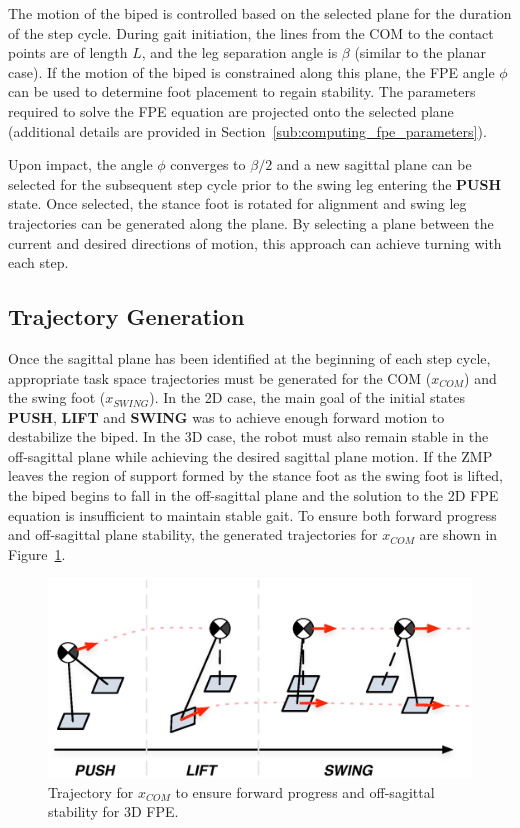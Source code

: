 The motion of the biped is controlled based on the selected plane for the duration of the step cycle. During gait initiation, the lines from the COM to the contact points are of length $L$, and the leg separation angle is $\beta$ (similar to the planar case). If the motion of the biped is constrained along this plane, the FPE angle $\phi$ can be used to determine foot placement to regain stability. The parameters required to solve the FPE equation are projected onto the selected plane (additional details are provided in Section~\ref{sub:computing_fpe_parameters}).

Upon impact, the angle $\phi$ converges to $\beta/2$ and a new sagittal plane can be selected for the subsequent step cycle prior to the swing leg entering the \textbf{PUSH} state. Once selected, the stance foot is rotated for alignment and swing leg trajectories can be generated along the plane. By selecting a plane between the current and desired directions of motion, this approach can achieve turning with each step.


\subsection{Trajectory Generation} %
\label{sub:trajectory_generation}
Once the sagittal plane has been identified at the beginning of each step cycle, appropriate task space trajectories must be generated for the COM ($x_{COM}$) and the swing foot ($x_{SWING}$). In the 2D case, the main goal of the initial states \textbf{PUSH}, \textbf{LIFT} and \textbf{SWING} was to achieve enough forward motion to destabilize the biped. In the 3D case, the robot must also remain stable in the off-sagittal plane while achieving the desired sagittal plane motion. If the ZMP leaves the region of support formed by the stance foot as the swing foot is lifted, the biped begins to fall in the off-sagittal plane and the solution to the 2D FPE equation is insufficient to maintain stable gait. To ensure both forward progress and off-sagittal plane stability, the generated trajectories for $x_{COM}$ are shown in Figure~\ref{fig:comtraj3d}. \\

\begin{figure}[!h]
	\centering
    \includegraphics[scale=0.6]{fig/fpe/comtraj3d.eps} 
  	\caption{Trajectory for $x_{COM}$ to ensure forward progress and off-sagittal stability for 3D FPE. \Incomplete}
	\label{fig:comtraj3d}
\end{figure}

